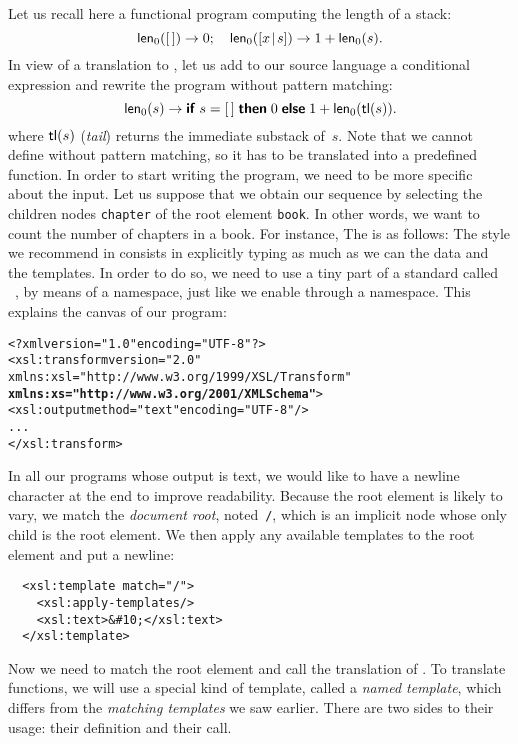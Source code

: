 Let us recall here a functional program computing the length of a
stack:
\begin{equation*}
\textsf{len}_0([\,]) \rightarrow 0;\quad
\textsf{len}_0([{x}\!\mid\!{s}]) \rightarrow 1 + \textsf{len}_0(s).
\end{equation*}
In view of a translation to \XSLT, let us add to our source language a
conditional expression and rewrite the program without pattern
matching:
\begin{equation}
\textsf{len}_0(s) \rightarrow \textsf{\textbf{if}} \; s = [\,] \; \textsf{\textbf{then}} \; 0 \;
\textsf{\textbf{else}} \; 1 + \textsf{len}_0(\textsf{tl}(s)).
\label{def:len0_xslt}
\end{equation}
where \(\textsf{tl}(s)\) (\emph{tail}) returns the immediate substack
of~\(s\). Note that we cannot define  without pattern
matching, so it has to be translated into a predefined function. In
order to start writing the \XSLT program, we need to be more specific
about the input. Let us suppose that we obtain our sequence by
selecting the children nodes \texttt{chapter} of the root element
\texttt{book}. In other words, we want to count the number of chapters
in a book. For instance, 
\noindent The \DTD is as follows:
The style we recommend in \XSLT consists in explicitly typing as much
as we can the data and the templates. In order to do so, we need to
use a tiny part of a standard called \XMLSchema~\citep{Walmsley_2002},
by means of a namespace, just like we enable \XSLT through a namespace. This explains the canvas of our program:
\begin{alltt}
<?xml version="1.0" encoding="UTF-8"?>
<xsl:transform version="2.0"
               xmlns:xsl="http://www.w3.org/1999/XSL/Transform"
               \textbf{xmlns:xs="http://www.w3.org/2001/XMLSchema"}>
  <xsl:output method="text" encoding="UTF-8"/>
  ...
</xsl:transform>
\end{alltt}
In all our \XSLT programs whose output is text, we would like to
have a newline character at the end to improve readability. Because
the root element is likely to vary, we match the \emph{document root},
noted~\texttt{/}, which is an implicit node whose only child is the
root element. We then apply any available templates to the root
element and put a newline:
\begin{verbatim}
  <xsl:template match="/">
    <xsl:apply-templates/>
    <xsl:text>&#10;</xsl:text>
  </xsl:template>
\end{verbatim}
Now we need to match the root element and call the translation of
. To translate functions, we will use a special kind
of template, called a \emph{named template}, which differs from the
\emph{matching templates} we saw earlier. There are two sides to their
usage: their definition and their call.

